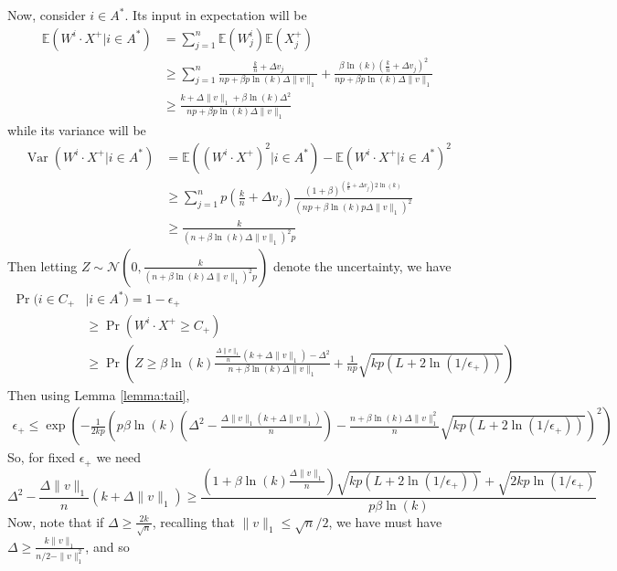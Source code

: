 \documentclass[final,12pt]{colt2022} %
\newcommand{\E}{\mathbb{E}}
\DeclareMathOperator{\var}{Var}
\newcommand{\assmcore}[1]{{#1}^*}
\begin{document}
Now, consider $i \in \assmcore{A}$. Its input in expectation will be \begin{align*}
    \E(W^i \cdot X^+ \vert i \in \assmcore{A}) &= \sum_{j=1}^n \E(W_j^i) \E(X_j^+)\\
    &\ge \sum_{j=1}^n \frac{\frac{k}{n} + \Delta v_j}{np + \beta p \ln(k) \Delta \|v\|_1}  + \frac{\beta \ln(k)\left(\frac{k}{n} + \Delta v_j\right)^2}{np + \beta p \ln(k) \Delta \|v\|_1}\\
    &\ge \frac{k + \Delta \|v\|_1 + \beta \ln(k)\Delta^2}{np + \beta p \ln(k) \Delta \|v\|_1}
\end{align*} while its variance will be \begin{align*}
    \var(W^i \cdot X^+ \vert i \in \assmcore{A}) &= \E((W^i \cdot X^+)^2 \vert i \in \assmcore{A}) - \E(W^i \cdot X^+ \vert i \in \assmcore{A})^2\\
    &\ge \sum_{j=1}^n p\left(\frac{k}{n} + \Delta v_j\right) \frac{(1+\beta)^{(\frac{k}{n} + \Delta v_j) 2\ln(k)}}{(np + \beta \ln(k) p \Delta \|v\|_1)^2}\\
    &\ge \frac{k}{(n + \beta \ln(k) \Delta \|v\|_1)^2p}
\end{align*} Then letting $Z \sim \mathcal N(0, \frac{k}{(n + \beta \ln(k) \Delta \|v\|_1)^2p})$ denote the uncertainty, we have \begin{align*}
    \Pr(i \in C_+ &\vert i \in \assmcore{A}) = 1 - \epsilon_+\\
    &\ge \Pr(W^i \cdot X^+ \ge C_+)\\
    &\ge \Pr\left(Z \ge \beta \ln(k)  \frac{\frac{\Delta \|v\|_1}{n}\left(k + \Delta \|v\|_1\right) - \Delta^2}{n + \beta \ln(k) \Delta \|v\|_1} + \frac{1}{np} \sqrt{kp(L + 2\ln(1/\epsilon_+))}\right)
\end{align*} Then using Lemma \ref{lemma:tail}, \begin{align*}
    \epsilon_+ \le \exp\left(-\tfrac{1}{2kp}\left(p\beta \ln(k)  \left(\Delta^2 - \tfrac{\Delta \|v\|_1\left(k + \Delta \|v\|_1\right)}{n}\right) -  \tfrac{n + \beta \ln(k) \Delta \|v\|_1^2}{n} \sqrt{kp(L + 2\ln(1/\epsilon_+))}\right)^2\right)
\end{align*} So, for fixed $\epsilon_+$ we need \[\Delta^2 - \frac{\Delta \|v\|_1}{n}\left(k + \Delta \|v\|_1\right) \ge \frac{\left(1 + \beta \ln(k)\frac{\Delta \|v\|_1}{n}\right) \sqrt{kp(L + 2\ln(1/\epsilon_+))} + \sqrt{2kp\ln(1/\epsilon_+)}}{p\beta \ln(k)} \] Now, note that if $\Delta \ge \frac{2k}{\sqrt{n}}$, recalling that $\|v\|_1 \le \sqrt{n}/2$, we have must have $\Delta \ge \frac{k\|v\|_1}{n/2 - \|v\|_1^2}$, and so \begin{align*}

\end{align*}
\end{document}
